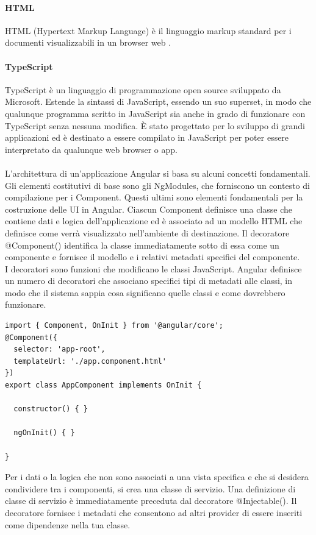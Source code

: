 \paragraph{HTML} HTML (Hypertext Markup Language) è il linguaggio markup standard per i documenti visualizzabili in un browser web \cite{HTML}.
\paragraph{TypeScript} TypeScript è un linguaggio di programmazione open source sviluppato da Microsoft. Estende la sintassi di JavaScript, essendo un suo superset, in modo che qualunque programma scritto in JavaScript sia anche in grado di funzionare con TypeScript senza nessuna modifica. È stato progettato per lo sviluppo di grandi applicazioni ed è destinato a essere compilato in JavaScript per poter essere interpretato da qualunque web browser o app. \cite{TYPESCRIPT} \\
\\
L'architettura di un'applicazione Angular si basa su alcuni concetti fondamentali. Gli elementi costitutivi di base sono gli NgModules, che forniscono un contesto di compilazione per i Component. Questi ultimi sono elementi fondamentali per la costruzione delle UI in Angular. Ciascun Component definisce una classe che contiene dati e logica dell'applicazione ed è associato ad un modello HTML che definisce come verrà visualizzato nell'ambiente di destinazione. Il decoratore @Component() identifica la classe immediatamente sotto di essa come un componente e fornisce il modello e i relativi metadati specifici del componente.\\
I decoratori sono funzioni che modificano le classi JavaScript. Angular definisce un numero di decoratori che associano specifici tipi di metadati alle classi, in modo che il sistema sappia cosa significano quelle classi e come dovrebbero funzionare.\cite{ANGULAR} \\
\begin{lstlisting}[caption={Esempio di un Component in Angular}, style=javaScriptCode]
import { Component, OnInit } from '@angular/core';
@Component({
  selector: 'app-root',
  templateUrl: './app.component.html'
})
export class AppComponent implements OnInit {

  constructor() { }

  ngOnInit() { }
  
}
\end{lstlisting}
Per i dati o la logica che non sono associati a una vista specifica e che si desidera condividere tra i componenti, si crea una classe di servizio. Una definizione di classe di servizio è immediatamente preceduta dal decoratore @Injectable(). Il decoratore fornisce i metadati che consentono ad altri provider di essere inseriti come dipendenze nella tua classe.\\
